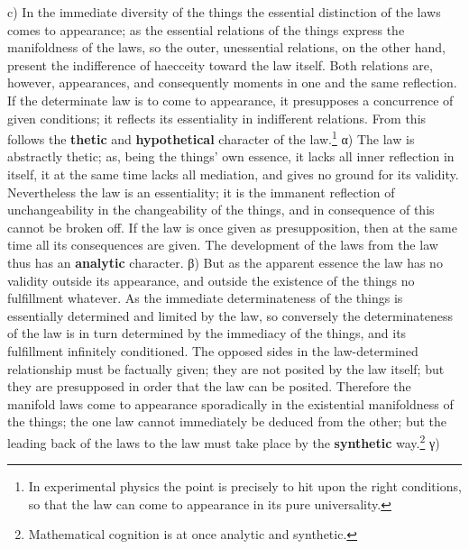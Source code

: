 \documentclass[12pt,a4paper,openany]{book}
\newcommand{\opage}[1]{\marginnote{\footnotesize\textit{[#1]}}}
\begin{document}
c) In the immediate diversity of the things the essential distinction of the laws
comes to appearance; as the essential relations of the things
express the manifoldness of the laws,
so the outer, unessential relations, on the other hand, present
the indifference of haecceity toward the law
itself. Both relations are, however, appearances,
and consequently moments in one and the same reflection.
If the determinate law is to come to appearance,
it presupposes a concurrence of given conditions;
it reflects its essentiality in indifferent
relations. From this follows the \textbf{thetic} and
\textbf{hypothetical} character of the law.\footnote{In experimental physics the point is precisely to hit upon the right conditions, so that the law can come to appearance in its pure universality.} α) The law
is abstractly thetic; as, being the things' own
essence, it lacks all inner reflection in itself,
it at the same time lacks all mediation, and gives no
ground for its validity. Nevertheless the law
is an essentiality; it is the immanent
reflection of unchangeability in the changeability of the things, and
in consequence of this cannot be broken off. If the law is once
given as presupposition, then at the same time
all its consequences are given. The development of the laws
from the law thus has an \textbf{analytic}
character. β) But as the apparent essence
the law has no validity outside its appearance,
and outside the existence of the things no fulfillment whatever.
As the immediate determinateness of the things
is essentially determined and limited by
the law, so conversely the determinateness of the law is in turn
\setcounter{footnote}{0}%
\opage{188}determined by the immediacy of the things, and its fulfillment
infinitely conditioned. The opposed sides in
the law-determined relationship must be factually given; they
are not posited by the law itself; but they are presupposed in order
that the law can be posited. Therefore the manifold
laws come to appearance sporadically in the existential manifoldness of the things; the one law cannot immediately
be deduced from the other; but the leading back of the laws
to the law must take place by the \textbf{synthetic} way.\footnote{Mathematical cognition is at once analytic and synthetic.} γ)
\end{document}
